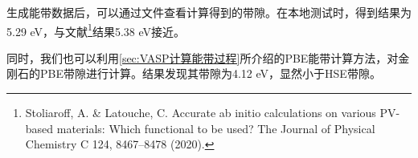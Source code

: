 生成能带数据后，可以通过文件查看计算得到的带隙。在本地测试时，得到结果为5.29 eV，与文献\footnote{Stoliaroff, A. \& Latouche, C. Accurate ab initio calculations on various PV-based materials: Which functional to be used? The Journal of Physical Chemistry C 124, 8467–8478 (2020).}结果5.38 eV接近。

同时，我们也可以利用\ref{sec:VASP计算能带过程}所介绍的PBE能带计算方法，对金刚石的PBE带隙进行计算。结果发现其带隙为4.12 eV，显然小于HSE带隙。
